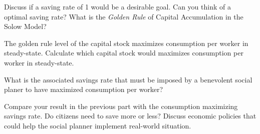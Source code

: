 {{	\item Discuss if a saving rate of 1 would be a desirable goal. Can you think of a optimal saving rate? What is the \textit{Golden Rule} of Capital Accumulation in the Solow Model? 
	\item The golden rule level of the capital stock maximizes consumption per worker in steady-state. 
	Calculate which capital stock would maximizes consumption per worker in steady-state. 
	\item What is the associated savings rate that must be imposed by a benevolent social planer to have maximized consumption per worker? 
	\item Compare your result in the previous part with the consumption maximizing savings rate. Do citizens need to save more or less? Discuss economic policies that could help the social planner implement real-world situation.
}
}


